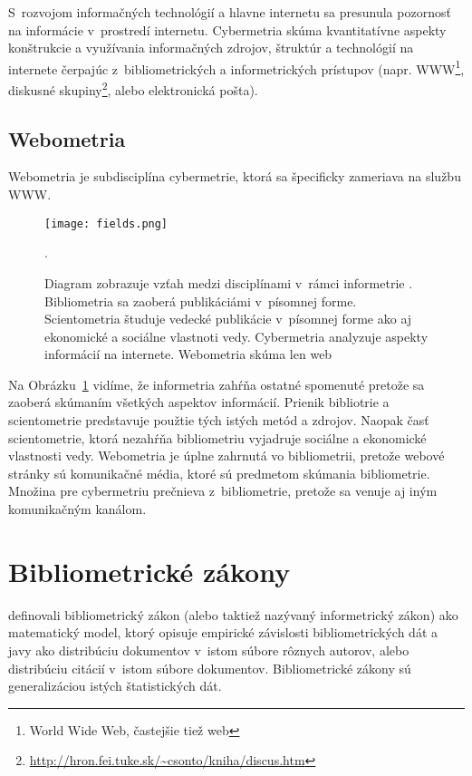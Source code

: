 S~rozvojom informačných technológií a hlavne internetu sa presunula pozornosť
na informácie v~prostredí internetu.  Cybermetria skúma kvantitatívne aspekty
konštrukcie a využívania informačných zdrojov, štruktúr a technológií na
internete čerpajúc z~bibliometrických a informetrických prístupov (napr.
WWW\footnote{World Wide Web, častejšie tiež web}, diskusné skupiny\footnote{\url{http://hron.fei.tuke.sk/~csonto/kniha/discus.htm}}, alebo
elektronická pošta).


\subsection{Webometria}

Webometria je subdisciplína cybermetrie, ktorá sa špecificky zameriava na službu WWW.


\begin{figure}
  \centering
  \texttt{[image: fields.png]}
  \caption[Vzťah medzi jednotlivými disciplínami v~rámci informetrie.]
    {Diagram zobrazuje vzťah medzi disciplínami v~rámci informetrie .
    Bibliometria sa zaoberá publikáciámi v~písomnej forme.
    Scientometria študuje vedecké publikácie v~písomnej forme ako aj
    ekonomické a sociálne vlastnoti vedy. Cybermetria analyzuje aspekty informácií
    na internete. Webometria skúma len web \citep{Bjorneborn2004}}.
  \label{fig:fields}
\end{figure}



Na Obrázku~\ref{fig:fields} vidíme, že informetria zahŕňa ostatné spomenuté
 pretože sa zaoberá skúmaním všetkých aspektov informácií.  Prienik
bibliotrie a scientometrie predstavuje použtie tých istých metód a zdrojov.
Naopak časť scientometrie, ktorá nezahŕňa bibliometriu vyjadruje sociálne a
ekonomické vlastnosti vedy. Webometria je úplne zahrnutá vo bibliometrii,
pretože webové stránky sú komunikačné média, ktoré sú predmetom skúmania
bibliometrie.  Množina pre cybermetriu prečnieva z~bibliometrie, pretože sa
venuje aj iným komunikačným kanálom.

\section{Bibliometrické zákony}

\citet{Todeschini2016} definovali bibliometrický zákon (alebo taktiež nazývaný
informetrický zákon) ako matematický model, ktorý opisuje empirické závislosti
bibliometrických dát a javy ako distribúciu dokumentov v~istom súbore rôznych
autorov, alebo distribúciu citácií v~istom súbore dokumentov.  Bibliometrické
zákony sú generalizáciou istých štatistických dát.

